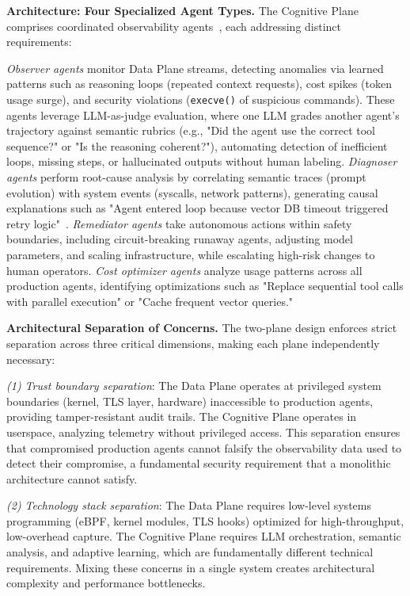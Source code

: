 \documentclass[sigplan,screen,9pt]{acmart}
\begin{document}
\textbf{Architecture: Four Specialized Agent Types.} The Cognitive Plane comprises coordinated observability agents~\cite{Rombaut2025Watson,Kim2025AgenticInterp,Dong2024AgentOps}, each addressing distinct requirements:

\emph{Observer agents} monitor Data Plane streams, detecting anomalies via learned patterns such as reasoning loops (repeated context requests), cost spikes (token usage surge), and security violations (\texttt{execve()} of suspicious commands). These agents leverage LLM-as-judge evaluation, where one LLM grades another agent's trajectory against semantic rubrics (e.g., "Did the agent use the correct tool sequence?" or "Is the reasoning coherent?"), automating detection of inefficient loops, missing steps, or hallucinated outputs without human labeling. \emph{Diagnoser agents} perform root-cause analysis by correlating semantic traces (prompt evolution) with system events (syscalls, network patterns), generating causal explanations such as "Agent entered loop because vector DB timeout triggered retry logic"~\cite{Moshkovich2025Pipeline}. \emph{Remediator agents} take autonomous actions within safety boundaries, including circuit-breaking runaway agents, adjusting model parameters, and scaling infrastructure, while escalating high-risk changes to human operators. \emph{Cost optimizer agents} analyze usage patterns across all production agents, identifying optimizations such as "Replace sequential tool calls with parallel execution" or "Cache frequent vector queries."

\textbf{Architectural Separation of Concerns.} The two-plane design enforces strict separation across three critical dimensions, making each plane independently necessary:

\emph{(1) Trust boundary separation}: The Data Plane operates at privileged system boundaries (kernel, TLS layer, hardware) inaccessible to production agents, providing tamper-resistant audit trails. The Cognitive Plane operates in userspace, analyzing telemetry without privileged access. This separation ensures that compromised production agents cannot falsify the observability data used to detect their compromise, a fundamental security requirement that a monolithic architecture cannot satisfy.

\emph{(2) Technology stack separation}: The Data Plane requires low-level systems programming (eBPF, kernel modules, TLS hooks) optimized for high-throughput, low-overhead capture. The Cognitive Plane requires LLM orchestration, semantic analysis, and adaptive learning, which are fundamentally different technical requirements. Mixing these concerns in a single system creates architectural complexity and performance bottlenecks.
\end{document}

